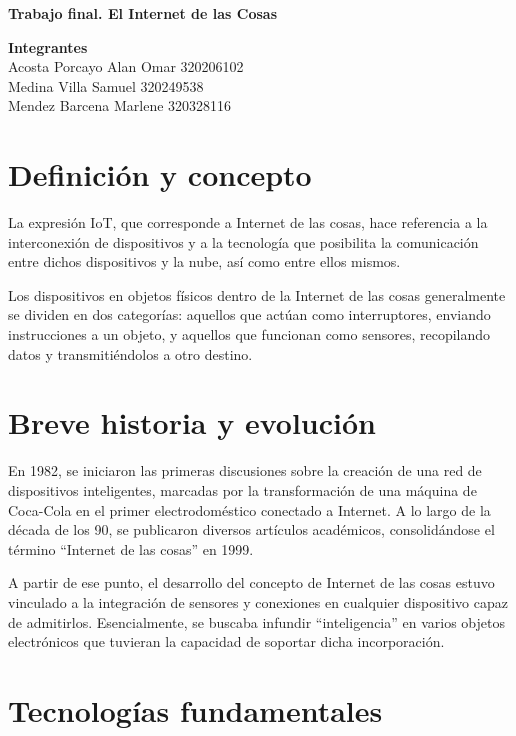 \documentclass[12pt]{article}
\newcommand{\linejump}{\hfill \break}
\begin{document}
  \begin{center}
    \linejump
    \LARGE \textbf{Trabajo final. El Internet de las Cosas}
  \end{center}

  \begin{flushright}
    \textbf{Integrantes} \\
    Acosta Porcayo Alan Omar 320206102 \\
    Medina Villa Samuel 320249538 \\
    Mendez Barcena Marlene 320328116 
  \end{flushright}

  \section*{Definición y concepto}
  La expresión IoT, que corresponde a Internet de las cosas, hace referencia a la interconexión de dispositivos y a la tecnología que posibilita la comunicación entre dichos dispositivos y la nube, así como entre ellos mismos.

  Los dispositivos en objetos físicos dentro de la Internet de las cosas generalmente se dividen en dos categorías: aquellos que actúan como interruptores, enviando instrucciones a un objeto, y aquellos que funcionan como sensores, recopilando datos y transmitiéndolos a otro destino.

  \section*{Breve historia y evolución}
  En 1982, se iniciaron las primeras discusiones sobre la creación de una red de dispositivos inteligentes, marcadas por la transformación de una máquina de Coca-Cola en el primer electrodoméstico conectado a Internet. A lo largo de la década de los 90, se publicaron diversos artículos académicos, consolidándose el término ``Internet de las cosas'' en 1999.

  A partir de ese punto, el desarrollo del concepto de Internet de las cosas estuvo vinculado a la integración de sensores y conexiones en cualquier dispositivo capaz de admitirlos. Esencialmente, se buscaba infundir ``inteligencia'' en varios objetos electrónicos que tuvieran la capacidad de soportar dicha incorporación.

  \section*{Tecnologías fundamentales}
\end{document}

